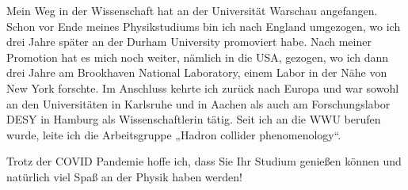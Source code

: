 \begin{multicols}{2}
Mein Weg in der Wissenschaft hat an der Universität Warschau angefangen. Schon vor Ende meines Physikstudiums bin ich nach England umgezogen, wo ich drei Jahre später an der Durham University promoviert habe. Nach meiner Promotion hat es mich noch weiter, nämlich in die USA, gezogen, wo ich dann drei Jahre am Brookhaven National Laboratory, einem Labor in der Nähe von New York forschte. Im Anschluss kehrte ich zurück nach Europa und war sowohl an den Universitäten in Karlsruhe und in Aachen als auch am Forschungslabor DESY in Hamburg als Wissenschaftlerin tätig. Seit ich an die WWU berufen wurde, leite ich die Arbeitsgruppe „Hadron collider phenomenology“. 

Trotz der COVID Pandemie hoffe ich, dass Sie Ihr Studium genießen können und natürlich viel Spaß an der Physik haben werden!

\end{multicols}

\vspace*{\fill}

\begin{center}
\end{center}

\vfill
